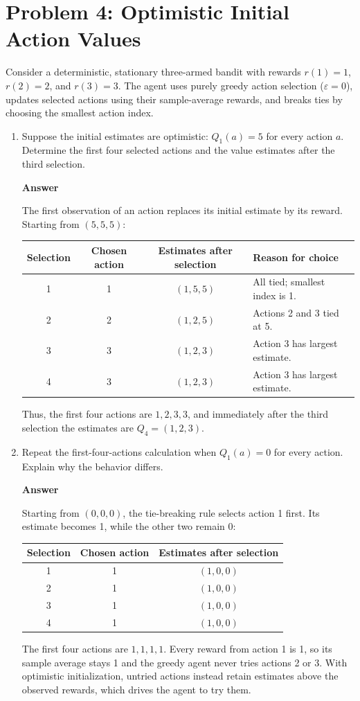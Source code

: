 \documentclass[11pt,a4paper]{article}
\newcommand{\answer}{\par\smallskip\textbf{Answer}\par}
\begin{document}
\newpage
\section{Problem 4: Optimistic Initial Action Values}
Consider a deterministic, stationary three-armed bandit with rewards $r(1)=1$, $r(2)=2$, and $r(3)=3$. The agent uses purely greedy action selection ($\varepsilon=0$), updates selected actions using their sample-average rewards, and breaks ties by choosing the smallest action index.
\begin{enumerate}
\item Suppose the initial estimates are optimistic: $Q_1(a)=5$ for every action $a$. Determine the first four selected actions and the value estimates after the third selection.
\answer
The first observation of an action replaces its initial estimate by its reward. Starting from $(5,5,5)$:
\begin{center}
\begin{tabular}{c c c l}
\hline
Selection & Chosen action & Estimates after selection & Reason for choice\\
\hline
1 & 1 & $(1,5,5)$ & All tied; smallest index is 1.\\
2 & 2 & $(1,2,5)$ & Actions 2 and 3 tied at 5.\\
3 & 3 & $(1,2,3)$ & Action 3 has largest estimate.\\
4 & 3 & $(1,2,3)$ & Action 3 has largest estimate.\\
\hline
\end{tabular}
\end{center}
Thus, the first four actions are $\boxed{1,2,3,3}$, and immediately after the third selection the estimates are $\boxed{Q_4=(1,2,3)}$.

\item Repeat the first-four-actions calculation when $Q_1(a)=0$ for every action. Explain why the behavior differs.
\answer
Starting from $(0,0,0)$, the tie-breaking rule selects action 1 first. Its estimate becomes 1, while the other two remain 0:
\begin{center}
\begin{tabular}{c c c}
\hline
Selection & Chosen action & Estimates after selection\\
\hline
1 & 1 & $(1,0,0)$\\
2 & 1 & $(1,0,0)$\\
3 & 1 & $(1,0,0)$\\
4 & 1 & $(1,0,0)$\\
\hline
\end{tabular}
\end{center}
The first four actions are $\boxed{1,1,1,1}$. Every reward from action 1 is 1, so its sample average stays 1 and the greedy agent never tries actions 2 or 3. With optimistic initialization, untried actions instead retain estimates above the observed rewards, which drives the agent to try them.


\end{enumerate}
\end{document}
